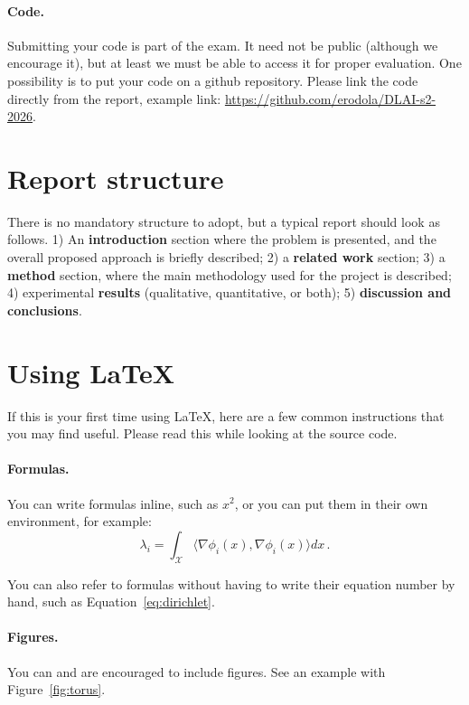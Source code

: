 \documentclass{article}
\begin{document}
\paragraph*{Code.} 
Submitting your code is part of the exam. It need not be public (although we encourage it), but at least we must be able to access it for proper evaluation. One possibility is to put your code on a github repository. Please link the code directly from the report, example link: \url{https://github.com/erodola/DLAI-s2-2026}.

\section{Report structure}

There is no mandatory structure to adopt, but a typical report should look as follows. 1) An \textbf{introduction} section where the problem is presented, and the overall proposed approach is briefly described; 2) a \textbf{related work} section; 3) a \textbf{method} section, where the main methodology used for the project is described; 4) experimental \textbf{results} (qualitative, quantitative, or both); 5) \textbf{discussion and conclusions}.

\section{Using \LaTeX}\label{sec:latex}

If this is your first time using \LaTeX, here are a few common instructions that you may find useful. Please read this while looking at the source code.

\paragraph*{Formulas.}
You can write formulas inline, such as $x^2$, or you can put them in their own environment, for example:
%
\begin{equation}\label{eq:dirichlet}
\lambda_i = \int_\mathcal{X} \langle \nabla \phi_i(x), \nabla \phi_i(x) \rangle dx \,.
\end{equation}

You can also refer to formulas without having to write their equation number by hand, such as Equation~\eqref{eq:dirichlet}.

\paragraph*{Figures.}
You can and are encouraged to include figures. See an example with Figure~\ref{fig:torus}.
\end{document}
